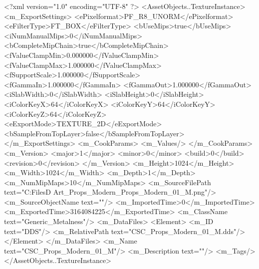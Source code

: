 <?xml version="1.0" encoding="UTF-8" ?>
<AssetObjects..TextureInstance>
	<m_ExportSettings>
		<ePixelformat>PF_R8_UNORM</ePixelformat>
		<eFilterType>FT_BOX</eFilterType>
		<bUseMips>true</bUseMips>
		<iNumManualMips>0</iNumManualMips>
		<bCompleteMipChain>true</bCompleteMipChain>
		<fValueClampMin>0.000000</fValueClampMin>
		<fValueClampMax>1.000000</fValueClampMax>
		<fSupportScale>1.000000</fSupportScale>
		<fGammaIn>1.000000</fGammaIn>
		<fGammaOut>1.000000</fGammaOut>
		<iSlabWidth>0</iSlabWidth>
		<iSlabHeight>0</iSlabHeight>
		<iColorKeyX>64</iColorKeyX>
		<iColorKeyY>64</iColorKeyY>
		<iColorKeyZ>64</iColorKeyZ>
		<eExportMode>TEXTURE_2D</eExportMode>
		<bSampleFromTopLayer>false</bSampleFromTopLayer>
	</m_ExportSettings>
	<m_CookParams>
		<m_Values/>
	</m_CookParams>
	<m_Version>
		<major>1</major>
		<minor>0</minor>
		<build>0</build>
		<revision>0</revision>
	</m_Version>
	<m_Height>1024</m_Height>
	<m_Width>1024</m_Width>
	<m_Depth>1</m_Depth>
	<m_NumMipMaps>10</m_NumMipMaps>
	<m_SourceFilePath text="C:\Users\Shadow\Desktop\Working Files\3D Art\Textures\CSC_Props_Modern\Current\textures\CSC_Props_Modern_01_M.png"/>
	<m_SourceObjectName text=""/>
	<m_ImportedTime>0</m_ImportedTime>
	<m_ExportedTime>3164084225</m_ExportedTime>
	<m_ClassName text="Generic_Metalness"/>
	<m_DataFiles>
		<Element>
			<m_ID text="DDS"/>
			<m_RelativePath text="CSC_Props_Modern_01_M.dds"/>
		</Element>
	</m_DataFiles>
	<m_Name text="CSC_Props_Modern_01_M"/>
	<m_Description text=""/>
	<m_Tags/>
</AssetObjects..TextureInstance>

